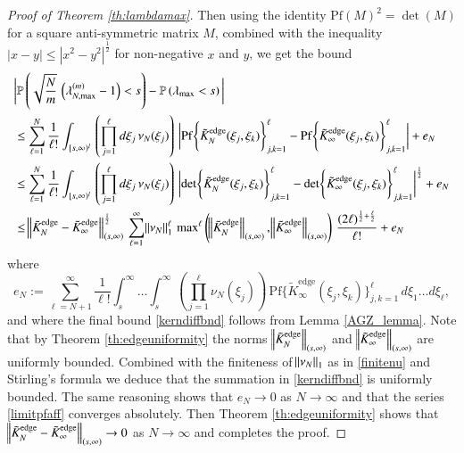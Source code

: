 \documentclass[11pt,reqno]{amsproc}
\numberwithin{equation}{section}
\numberwithin{theorem}{section}
\begin{document}
\begin{proof}[Proof of Theorem \ref{th:lambdamax}]
Then using the identity $\mathrm{Pf}(M)^{2} = \det(M)$ for a square anti-symmetric matrix $M$, combined with the inequality $|x-y| \leq |x^{2}-y^{2}|^{\frac{1}{2}}$ for non-negative $x$ and $y$, we get the bound
\begin{align}
&\bigg{|}\mathbb{P}\left(\sqrt{\frac{N}{m}}\,\left(\lambda^{(m)}_{N,\mathrm{max}}-1\right) < s\right)-\mathbb{P}\left(\lambda_{\mathrm{max}} < s\right)\bigg{|}\\
&\leq \sum_{\ell=1}^{N}\frac{1}{\ell!}\int_{[s,\infty)^{l}}\,\left(\prod_{j=1}^{\ell}d\xi_{j}\,\nu_{N}(\xi_j)\right)\,\bigg{|}\mathrm{Pf}\bigg\{\tilde{K}^{\mathrm{edge}}_{N}(\xi_{j},\xi_{k})\bigg\}_{j,k=1}^{\ell}-\mathrm{Pf}\bigg\{\tilde{K}_{\infty}^{\mathrm{edge}}(\xi_{j},\xi_{k})\bigg\}_{j,k=1}^{\ell}\bigg{|}+e_{N}\\
&\leq\sum_{\ell=1}^{N}\frac{1}{\ell!}\int_{[s,\infty)^{l}}\,\left(\prod_{j=1}^{\ell}d\xi_{j}\,\nu_{N}(\xi_j)\right)\,\bigg{|}\mathrm{det}\bigg\{\tilde{K}^{\mathrm{edge}}_{N}(\xi_{j},\xi_{k})\bigg\}_{j,k=1}^{\ell}-\mathrm{det}\bigg\{\tilde{K}^{\mathrm{edge}}_{\infty}(\xi_{j},\xi_{k})\bigg\}_{j,k=1}^{\ell}\bigg{|}^{\frac{1}{2}}+e_{N}\\
&\leq \norm{\tilde{K}^{\mathrm{edge}}_{N}-\tilde{K}^{\mathrm{edge}}_{\infty}}_{(s,\infty)}^{\frac{1}{2}}\,\sum_{\ell=1}^{\infty}\norm{\nu_{N}}_{1}^{\ell}\,\mathrm{max}^{\ell}\left(\norm{\tilde{K}^{\mathrm{edge}}_{N}}_{(s,\infty)},\norm{\tilde{K}_{\infty}^{\mathrm{edge}}}_{(s,\infty)}\right)\,\frac{(2\ell)^{\frac{1}{2}+\frac{\ell}{2}}}{\ell!}+e_{N}\label{kerndiffbnd}
\end{align}
where
\begin{equation}
e_{N} := \sum_{\ell=N+1}^{\infty}\frac{1}{\ell!}\int_{s}^{\infty}\ldots \int_{s}^{\infty}\,\left(\prod_{j=1}^{\ell}\nu_{N}(\xi_j)\right)\,\mathrm{Pf}\bigg\{\tilde{K}_{\infty}^{\mathrm{edge}}(\xi_{j},\xi_{k})\bigg\}_{j,k=1}^{\ell}\,d\xi_{1}\ldots d\xi_{\ell},
\end{equation}
and where the final bound \eqref{kerndiffbnd} follows from Lemma \ref{AGZ_lemma}. Note that by Theorem \ref{th:edgeuniformity} the norms $\norm{\tilde{K}^{\mathrm{edge}}_{N}}_{(s,\infty)}$ and $\norm{\tilde{K}^{\mathrm{edge}}_{\infty}}_{(s,\infty)}$ are uniformly bounded. Combined with the finiteness of $\norm{\nu_{N}}_{1}$ as in \eqref{finitenu} and Stirling's formula we deduce that the summation in \eqref{kerndiffbnd} is uniformly bounded.  The same reasoning shows that $e_{N} \to 0$ as $N \to \infty$ and that the series \eqref{limitpfaff} converges absolutely. Then Theorem \ref{th:edgeuniformity} shows that $\norm{\tilde{K}^{\mathrm{edge}}_{N}-\tilde{K}_{\infty}^{\mathrm{edge}}}_{(s,\infty)} \to 0$ as $N \to \infty$ and completes the proof.
\end{proof}
\end{document}
